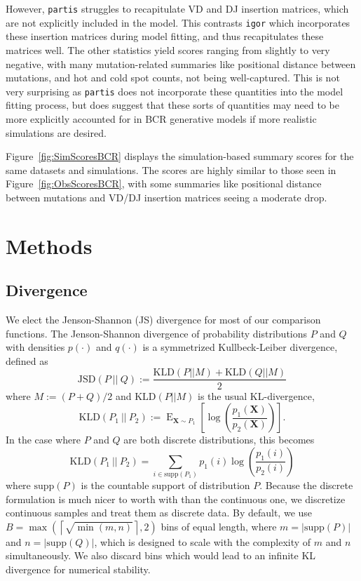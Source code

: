 \documentclass{article}
\begin{document}
However, \texttt{partis} struggles to recapitulate VD and DJ insertion matrices, which are not explicitly included in the model.
This contrasts \texttt{igor} which incorporates these insertion matrices during model fitting, and thus recapitulates these matrices well.
The other statistics yield scores ranging from slightly to very negative, with many mutation-related summaries like positional distance between mutations, and hot and cold spot counts, not being well-captured.
This is not very surprising as \texttt{partis} does not incorporate these quantities into the model fitting process, but does suggest that these sorts of quantities may need to be more explicitly accounted for in BCR generative models if more realistic simulations are desired.


Figure~\ref{fig:SimScoresBCR} displays the simulation-based summary scores for the same datasets and simulations.
The scores are highly similar to those seen in Figure~\ref{fig:ObsScoresBCR}, with some summaries like positional distance between mutations and VD/DJ insertion matrices seeing a moderate drop.


\section*{Methods}
\subsection*{Divergence}
We elect the Jenson-Shannon (JS) divergence for most of our comparison functions.
The Jenson-Shannon divergence of probability distributions $P$ and $Q$ with densities $p(\cdot)$ and $q(\cdot)$ is a symmetrized Kullbeck-Leiber divergence, defined as
\begin{equation}
\text{JSD}\left(P \ || \ Q\right) := \frac{\text{KLD}\left(P || M\right) + \text{KLD}\left(Q || M\right)}{2}
\end{equation}
where $M := (P + Q)/2$ and $\text{KLD}(P || M)$ is the usual KL-divergence,
\begin{equation}
\text{KLD}\left(P_1 \ || \ P_2\right) := \operatorname{E}_{\mathbf X \sim P_1}\left[ \log\left(\frac{p_1(\mathbf X)}{p_2(\mathbf X)}\right) \right].
\end{equation}
In the case where $P$ and $Q$ are both discrete distributions, this becomes
\begin{equation}
\text{KLD}\left(P_1 \ || \ P_2\right) = \sum_{i \in \text{supp}(P_1)} p_1(i) \log\left( \frac{p_1(i)}{p_2(i)} \right)
\end{equation}
where $\text{supp}(P)$ is the countable support of distribution $P$.
Because the discrete formulation is much nicer to worth with than the continuous one, we discretize continuous samples and treat them as discrete data.
By default, we use $B = \max\left(\left\lceil \sqrt{\min(m, n)} \right \rceil, 2\right)$ bins of equal length, where $m = |\text{supp}(P)|$ and $n = |\text{supp}(Q)|$, which is designed to scale with the complexity of $m$ and $n$ simultaneously.
We also discard bins which would lead to an infinite KL divergence for numerical stability.
\end{document}
